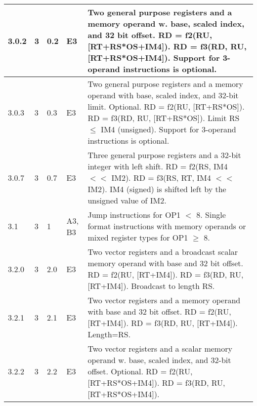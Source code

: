 \documentclass[forwardcom.tex]{subfiles}
\begin{document}
\begin{longtable} {|p{10mm}|p{6mm}|p{9mm}|p{7mm}|p{80mm}|}
\hline
3.0.2 & 3 & 0.2  & E3 & Two general purpose registers and a memory operand w. base, scaled index, and 32 bit offset.\newline 
RD = f2(RU, [RT+RS*OS+IM4]). \newline 
RD = f3(RD, RU, [RT+RS*OS+IM4]).\newline
Support for 3-operand instructions is optional.\\


\hline
3.0.3 & 3 & 0.3  & E3 & Two general purpose registers and a memory operand with base, scaled index, and 32-bit limit. Optional. \newline 
RD = f2(RU, [RT+RS*OS]). \newline 
RD = f3(RD, RU, [RT+RS*OS]). \newline 
Limit RS $\leq$ IM4 (unsigned).\newline
Support for 3-operand instructions is optional.\\

\hline
3.0.7 & 3 & 0.7  & E3 & Three general purpose registers and a 32-bit integer with left shift.\newline 
RD = f2(RS, IM4 $<<$ IM2). \newline 
RD = f3(RS, RT, IM4 $<<$ IM2). \newline 
IM4 (signed) is shifted left by the unsigned value of IM2. \\

\hline
3.1 & 3 & 1 & A3, B3 & Jump instructions for OP1 $<$ 8. Single format instructions with memory operands or mixed register types for OP1 $\geq$ 8.\\

\hline
3.2.0 & 3 & 2.0 & E3 & Two vector registers and a broadcast scalar memory operand with base and 32 bit offset.\newline 
RD = f2(RU, [RT+IM4]). \newline 
RD = f3(RD, RU, [RT+IM4]). \newline 
Broadcast to length RS.\\

\hline
3.2.1 & 3 & 2.1 & E3 & Two vector registers and a memory operand with base and 32 bit offset.\newline 
RD = f2(RU, [RT+IM4]). \newline 
RD = f3(RD, RU, [RT+IM4]). \newline 
Length=RS.\\

\hline
3.2.2 & 3 & 2.2 & E3 & Two vector registers and a scalar memory operand w. base, scaled index, and 32-bit offset. Optional. \newline 
RD = f2(RU, [RT+RS*OS+IM4]). \newline 
RD = f3(RD, RU, [RT+RS*OS+IM4]).\\


\end{longtable}
\end{document}
